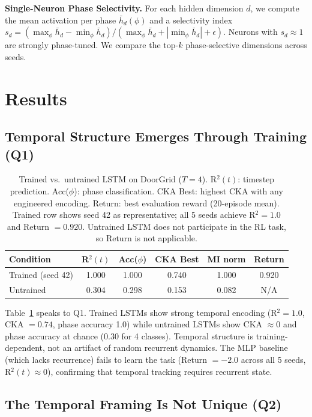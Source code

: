 \documentclass{article}
\begin{document}
\textbf{Single-Neuron Phase Selectivity.}
For each hidden dimension $d$, we compute the mean activation per phase $\bar{h}_d(\phi)$ and a selectivity index $s_d = (\max_\phi \bar{h}_d - \min_\phi \bar{h}_d) / (\max_\phi \bar{h}_d + |\min_\phi \bar{h}_d| + \epsilon)$.
Neurons with $s_d \approx 1$ are strongly phase-tuned.
We compare the top-$k$ phase-selective dimensions across seeds.

\section{Results}

\subsection{Temporal Structure Emerges Through Training (Q1)}
\label{sec:learned}

\begin{table}[t]
\centering
\caption{Trained vs.\ untrained LSTM on DoorGrid ($T = 4$).
R$^2(t)$: timestep prediction. Acc($\phi$): phase classification.
CKA Best: highest CKA with any engineered encoding.
Return: best evaluation reward (20-episode mean).
Trained row shows seed 42 as representative; all 5 seeds achieve R$^2 = 1.0$ and Return $= 0.920$.
Untrained LSTM does not participate in the RL task, so Return is not applicable.}
\label{tab:main}
\begin{tabular}{lccccc}
\toprule
\textbf{Condition} & \textbf{R$^2(t)$} & \textbf{Acc($\phi$)} & \textbf{CKA Best} & \textbf{MI norm} & \textbf{Return} \\
\midrule
Trained (seed 42) & 1.000 & 1.000 & 0.740 & 1.000 & 0.920 \\
Untrained         & 0.304 & 0.298 & 0.153 & 0.082 & N/A \\
\bottomrule
\end{tabular}
\end{table}

Table~\ref{tab:main} speaks to Q1.
Trained LSTMs show strong temporal encoding (R$^2 = 1.0$, CKA $= 0.74$, phase accuracy 1.0) while untrained LSTMs show CKA $\approx 0$ and phase accuracy at chance ($0.30$ for 4 classes).
Temporal structure is training-dependent, not an artifact of random recurrent dynamics.
The MLP baseline (which lacks recurrence) fails to learn the task (Return $= -2.0$ across all 5 seeds, R$^2(t) \approx 0$), confirming that temporal tracking requires recurrent state.

\subsection{The Temporal Framing Is Not Unique (Q2)}
\label{sec:degenerate}
\end{document}
